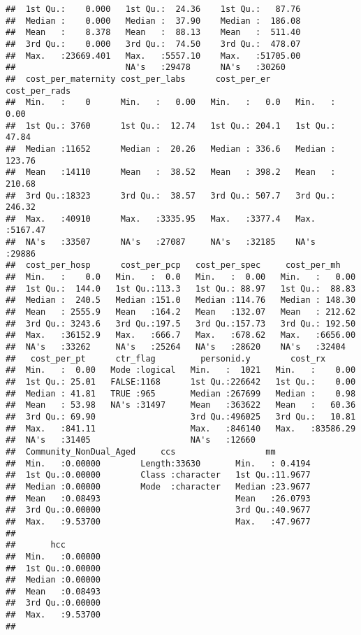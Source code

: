 \documentclass[]{article}
\begin{document}
\begin{verbatim}
##  1st Qu.:    0.000   1st Qu.:  24.36    1st Qu.:   87.76  
##  Median :    0.000   Median :  37.90    Median :  186.08  
##  Mean   :    8.378   Mean   :  88.13    Mean   :  511.40  
##  3rd Qu.:    0.000   3rd Qu.:  74.50    3rd Qu.:  478.07  
##  Max.   :23669.401   Max.   :5557.10    Max.   :51705.00  
##                      NA's   :29478      NA's   :30260     
##  cost_per_maternity cost_per_labs      cost_per_er     cost_per_rads    
##  Min.   :    0      Min.   :   0.00   Min.   :   0.0   Min.   :   0.00  
##  1st Qu.: 3760      1st Qu.:  12.74   1st Qu.: 204.1   1st Qu.:  47.84  
##  Median :11652      Median :  20.26   Median : 336.6   Median : 123.76  
##  Mean   :14110      Mean   :  38.52   Mean   : 398.2   Mean   : 210.68  
##  3rd Qu.:18323      3rd Qu.:  38.57   3rd Qu.: 507.7   3rd Qu.: 246.32  
##  Max.   :40910      Max.   :3335.95   Max.   :3377.4   Max.   :5167.47  
##  NA's   :33507      NA's   :27087     NA's   :32185    NA's   :29886    
##  cost_per_hosp      cost_per_pcp   cost_per_spec     cost_per_mh     
##  Min.   :    0.0   Min.   :  0.0   Min.   :  0.00   Min.   :   0.00  
##  1st Qu.:  144.0   1st Qu.:113.3   1st Qu.: 88.97   1st Qu.:  88.83  
##  Median :  240.5   Median :151.0   Median :114.76   Median : 148.30  
##  Mean   : 2555.9   Mean   :164.2   Mean   :132.07   Mean   : 212.62  
##  3rd Qu.: 3243.6   3rd Qu.:197.5   3rd Qu.:157.73   3rd Qu.: 192.50  
##  Max.   :36152.9   Max.   :666.7   Max.   :678.62   Max.   :6656.00  
##  NA's   :33262     NA's   :25264   NA's   :28620    NA's   :32404    
##   cost_per_pt      ctr_flag         personid.y        cost_rx        
##  Min.   :  0.00   Mode :logical   Min.   :  1021   Min.   :    0.00  
##  1st Qu.: 25.01   FALSE:1168      1st Qu.:226642   1st Qu.:    0.00  
##  Median : 41.81   TRUE :965       Median :267699   Median :    0.98  
##  Mean   : 53.98   NA's :31497     Mean   :363622   Mean   :   60.36  
##  3rd Qu.: 69.90                   3rd Qu.:496025   3rd Qu.:   10.81  
##  Max.   :841.11                   Max.   :846140   Max.   :83586.29  
##  NA's   :31405                    NA's   :12660                      
##  Community_NonDual_Aged     ccs                  mm         
##  Min.   :0.00000        Length:33630       Min.   : 0.4194  
##  1st Qu.:0.00000        Class :character   1st Qu.:11.9677  
##  Median :0.00000        Mode  :character   Median :23.9677  
##  Mean   :0.08493                           Mean   :26.0793  
##  3rd Qu.:0.00000                           3rd Qu.:40.9677  
##  Max.   :9.53700                           Max.   :47.9677  
##                                                             
##       hcc         
##  Min.   :0.00000  
##  1st Qu.:0.00000  
##  Median :0.00000  
##  Mean   :0.08493  
##  3rd Qu.:0.00000  
##  Max.   :9.53700  
## 
\end{verbatim}
\end{document}
